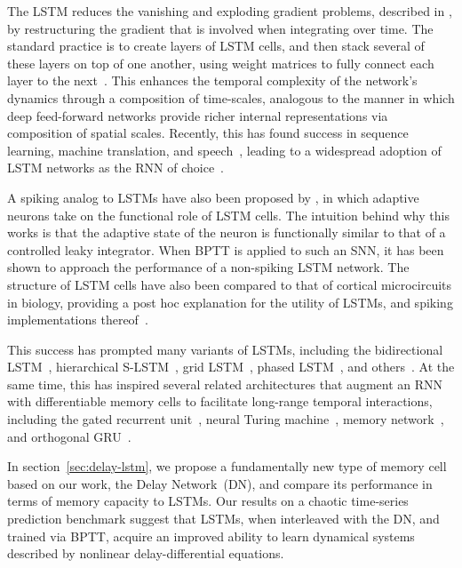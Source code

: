 The LSTM reduces the vanishing and exploding gradient problems, described in \citet{bengio1994learning}, by restructuring the gradient that is involved when integrating over time.
The standard practice is to create layers of LSTM cells, and then stack several of these layers on top of one another, using weight matrices to fully connect each layer to the next~\citep{graves2013speech}.
This enhances the temporal complexity of the network's dynamics through a composition of time-scales, analogous to the manner in which deep feed-forward networks provide richer internal representations via composition of spatial scales.
Recently, this has found success in sequence learning, machine translation, and speech~\citep{graves2013speech, sutskever2014sequence, cho2014learning, bahdanau2014neural}, leading to a widespread adoption of LSTM networks as the RNN of choice~\citep{lecun2015deep}.

A spiking analog to LSTMs have also been proposed by \citet{bellec2018long}, in which adaptive neurons take on the functional role of LSTM cells.
The intuition behind why this works is that the adaptive state of the neuron is functionally similar to that of a controlled leaky integrator.
When BPTT is applied to such an SNN, it has been shown to approach the performance of a non-spiking LSTM network.
The structure of LSTM cells have also been compared to that of cortical microcircuits in biology, providing a post hoc explanation for the utility of LSTMs, and spiking implementations thereof~\citep{costa2017cortical, pozzi2018gating}.

This success has prompted many variants of LSTMs, including the bidirectional LSTM~\citep{graves2005framewise}, hierarchical S-LSTM~\citep{zhu2015long}, grid LSTM~\citep{kalchbrenner2015grid}, phased LSTM~\citep{neil2016phased}, and others~\citep{salehinejad2017recent}.
At the same time, this has inspired several related architectures that augment an RNN with differentiable memory cells to facilitate long-range temporal interactions, including the gated recurrent unit~\citep[GRU;][]{cho2014properties, chung2014empirical}, neural Turing machine~\citep{graves2014neural}, memory network~\citep{weston2014memory}, and orthogonal GRU~\citep{jing2018gated}.

In section~\ref{sec:delay-lstm}, we propose a fundamentally new type of memory cell based on our work, the Delay Network~(DN), and compare its performance in terms of memory capacity to LSTMs.
Our results on a chaotic time-series prediction benchmark suggest that LSTMs, when interleaved with the DN, and trained via BPTT, acquire an improved ability to learn dynamical systems described by nonlinear delay-differential equations.

